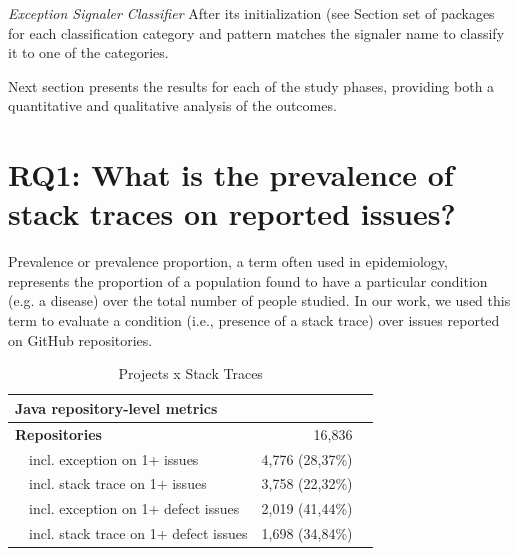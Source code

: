 \documentclass[conference]{IEEEtran}
\begin{document}
\noindent\emph{Exception Signaler Classifier} After its initialization (see Section 
set of packages for each classification category and pattern matches the signaler name
to classify it to one of the categories. 

Next section presents the results for each of the study phases, providing both a quantitative and qualitative analysis of the outcomes.


\section{RQ1: What is the prevalence of stack traces on reported issues?}

Prevalence or prevalence proportion, a term often used in epidemiology, represents the proportion of a population found to have a particular condition (e.g. a disease) over the total number of people studied. In our work, we used this term to evaluate a condition (i.e., presence of a stack trace) over issues reported on GitHub repositories. 



\begin{table}
\centering
\begin{tabular}{p{1em}lrr}
\hline
 \multicolumn{2}{l}{\bfseries{Java repository-level metrics}} & \\
\hline
\multicolumn{2}{l}{\bfseries{Repositories}} & 16,836\\
    & incl. exception on 1+ issues & 4,776 (28,37\%) \\
    & incl. stack trace on 1+ issues & 3,758 (22,32\%) \\
    & incl. exception on 1+ defect issues & 2,019 (41,44\%)\\
    & incl. stack trace on 1+ defect issues  & 1,698 (34,84\%) \\
 
\hline
\end{tabular}
\caption{Projects x Stack Traces}
\label{tab:proj}
\end{table}
\end{document}
